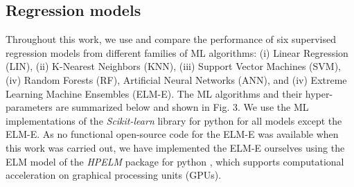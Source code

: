 \subsection{Regression models}
\label{ML_models}
\label{RF}
Throughout this work, we use and compare the performance of six supervised regression models from different families of ML algorithms: (i) Linear Regression (LIN), (ii) K-Nearest Neighbors (KNN), (iii) Support Vector Machines (SVM), (iv) Random Forests (RF), Artificial Neural Networks (ANN), and (iv) Extreme Learning Machine Ensembles (ELM-E).
The ML algorithms and their hyper-parameters are summarized below and shown in Fig. 3. 
We use the ML implementations of the \textit{Scikit-learn} library for python \cite{pedregosa_scikit-learn:_2011} for all models except the ELM-E. As no functional open-source code for the ELM-E was available when this work was carried out, we have implemented the ELM-E ourselves using the ELM model of the \textit{HPELM} package for python \cite{akusok_high-performance_2015}, which supports computational acceleration on graphical processing units (GPUs).



